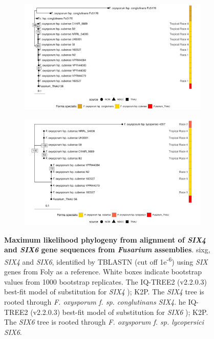 \begin{figure}[hp!]
\centering
    \begin{subfigure}[]{0.9\textwidth}
        \centering
        \includegraphics[width=\textwidth]{Figures/FusSIX4.phylo.png}
        \caption{}
        \label{fig:FusSIX4.phylo}
    \end{subfigure}
        \begin{subfigure}[]{0.9\textwidth}
        \centering
        \includegraphics[width=\textwidth]{Figures/FusSIX6.phylo.png}
        \caption{}
        \label{fig:FusSIX6.phylo}
    \end{subfigure}
    \caption[Maximum likelihood phylogeny from alignment of \textit{SIX4} and \textit{SIX6} gene sequences from \textit{Fusarium} assemblies.]{\textbf{Maximum likelihood phylogeny from alignment of \textit{SIX4} and \textit{SIX6} gene sequences from \textit{Fusarium} assemblies}.
    \acl{sixg}, \textit{SIX4} and \textit{SIX6}, identified by TBLASTN (cut off 1e\textsuperscript{-6}) using \textit{SIX} genes from \acl{Foly} as a reference. White boxes indicate bootstrap values from 1000 bootstrap replicates. The IQ-TREE2 (v2.2.0.3) best-fit model of substitution for \textit{SIX4} ); K2P. The \textit{SIX4} tree is rooted through \textit{F. oxysporum f. sp. conglutinans} \textit{SIX4}. he IQ-TREE2 (v2.2.0.3) best-fit model of substitution for \textit{SIX6} ); K2P. The  \textit{SIX6}  tree is rooted through \textit{F. oxysporum f. sp. lycopersici} \textit{SIX6}.}
    \label{fig:FusSIXMultiPhylo}
\end{figure}

